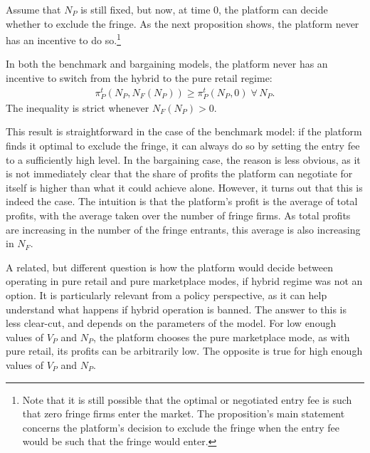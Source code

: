Assume that $N_P$ is still fixed, but now, at time 0, the platform can decide whether to exclude the fringe.
As the next proposition shows, the platform never has an incentive to do so.\footnote{
    Note that it is still possible that the optimal or negotiated entry fee is such that zero fringe firms enter the market.
    The proposition's main statement concerns the platform's decision to exclude the fringe when the entry fee would be such that the fringe would enter.
}
\begin{proposition}
    \label{prop:hybrid_vs_retail}
    In both the benchmark and bargaining models, the platform never has an incentive to switch from the hybrid to the pure retail regime:
    \begin{align*}
        \pi_P^t(N_P, N_F(N_P)) \geq \pi_P^t(N_P, 0) \;\forall\, N_P.
    \end{align*}
    The inequality is strict whenever $N_F(N_P) > 0$.
\end{proposition}
This result is straightforward in the case of the benchmark model: if the platform finds it optimal to exclude the fringe, it can always do so by setting the entry fee to a sufficiently high level.
In the bargaining case, the reason is less obvious, as it is not immediately clear that the share of profits the platform can negotiate for itself is higher than what it could achieve alone.
However, it turns out that this is indeed the case.
The intuition is that the platform's profit is the average of total profits, with the average taken over the number of fringe firms.
As total profits are increasing in the number of the fringe entrants, this average is also increasing in $N_F$.

A related, but different question is how the platform would decide between operating in pure retail and pure marketplace modes, if hybrid regime was not an option.
It is particularly relevant from a policy perspective, as it can help understand what happens if hybrid operation is banned.
The answer to this is less clear-cut, and depends on the parameters of the model.
For low enough values of $V_P$ and $N_P$, the platform chooses the pure marketplace mode, as with pure retail, its profits can be arbitrarily low.
The opposite is true for high enough values of $V_P$ and $N_P$.

